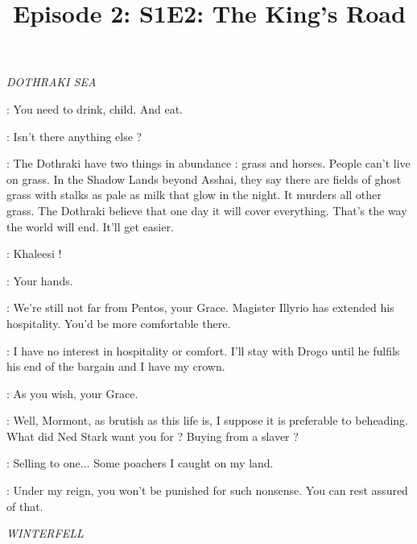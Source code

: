 

\title{Episode 2: S1E2: The King's Road}
\author{}
\date{}
\maketitle



\scene

\textit{DOTHRAKI SEA}


\JORAH: You need to drink, child. And eat. 

\DAENERYS: Isn't there anything else ? 

\JORAH: The Dothraki have two things in abundance : grass and horses. People can't live on grass. In the Shadow Lands beyond Asshai, they say there are fields of ghost grass with stalks as pale as milk that glow in the night. It murders all other grass. The Dothraki believe that one day it will cover everything. That's the way the world will end. It'll get easier. 


\DOREAH: Khaleesi ! 

\IRRI: Your hands. 

\JORAH: We're still not far from Pentos, your Grace. Magister Illyrio has extended his hospitality. You'd be more comfortable there. 

\VISERYS: I have no interest in hospitality or comfort. I'll stay with Drogo until he fulfils his end of the bargain and I have my crown. 

\JORAH: As you wish, your Grace. 

\VISERYS: Well, Mormont, as brutish as this life is, I suppose it is preferable to beheading. What did Ned Stark want you for ? Buying from a slaver ? 

\JORAH: Selling to one$\ldots$ Some poachers I caught on my land. 

\VISERYS: Under my reign, you won't be punished for such nonsense. You can rest assured of that. 

\scene

\textit{WINTERFELL}


